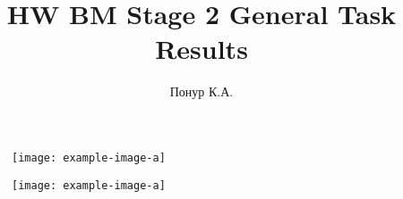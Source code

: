 



\setcounter{secnumdepth}{0}
\title{HW BM Stage 2 General Task Results}
\author{Понур К.А.}

\usepackage{lipsum}


\maketitle
\thispagestyle{empty}

\begin{figure}[t]
    \centering
    \texttt{[image: example-image-a]}
    \caption{}
    \label{fig:}
\end{figure}

\begin{figure}[t]
    \centering
    \texttt{[image: example-image-a]}
    \caption{}
    \label{fig:}
\end{figure}

\lipsum
\lipsum

\printbibliography



